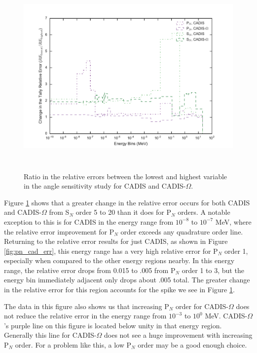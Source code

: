 \begin{figure}[h!]
  \centering
  \includegraphics[height=10cm]{./chapters/characterization_probs/figures/angle/prob_1/improvement_err_allmethds.pdf}
  \caption[Ratio in the relative errors between the lowest and highest variable in the angle
  sensitivity study for CADIS and CADIS-$\Omega$.]{Ratio in the relative errors between
    the lowest and highest variable in the angle sensitivity study for CADIS and CADIS-$\Omega$.}
  \label{fig:angle_err_improvements}
\end{figure}

Figure \ref{fig:angle_err_improvements} shows that a greater change in the
relative error occurs for both CADIS and CADIS-$\Omega$ from S$_N$ order 5 to 20
than it does for P$_N$ orders. A notable exception to this is for CADIS in the
energy range from $10^{-8}$ to $10^{-7}$ MeV, where the relative error
improvement for P$_N$ order exceeds any quadrature order line.
Returning to
the relative error results for just CADIS, as shown in Figure
\ref{fig:pn_cad_err}, this energy range has a very high relative error for P$_N$
order 1, especially when compared to the other energy regions nearby. In this
energy range, the relative error drops from 0.015 to .005 from P$_N$ order 1 to
3, but the energy bin immediately adjacent
only drops about .005 total. The greater change
in the relative error for this region accounts for the spike we see in Figure
\ref{fig:angle_err_improvements}.

The data in this figure also shows us that increasing P$_N$ order for
CADIS-$\Omega$ does not reduce the relative error in the energy range from
$10^{-3}$ to $10^{0}$ MeV. CADIS-$\Omega$'s purple line on this figure is
located below unity in that energy region. Generally this line for
CADIS-$\Omega$ does not see a huge improvement with increasing P$_N$ order.
For a problem like this, a low P$_N$ order may be a good enough choice.

